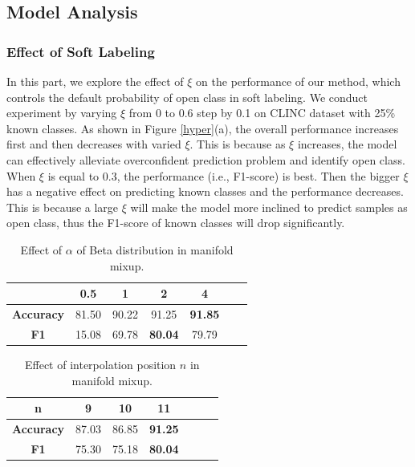 \documentclass[journal]{IEEEtran}
\newcommand{\bm}[1]{\mbox{\boldmath{$#1$}}}
\begin{document}
\subsection{Model Analysis}

\subsubsection{Effect of Soft Labeling}
In this part, we explore the effect of $\xi$ on the performance of our method, which controls the default probability of open class in soft labeling.
We conduct experiment by varying $\xi$ from 0 to 0.6 step by 0.1 on CLINC dataset with 25\% known classes.
As shown in Figure \ref{hyper}(a), the overall performance increases first and then decreases with varied $\xi$.
This is because as $\xi$ increases, the model can effectively alleviate overconfident prediction problem and identify open class.
When $\xi$ is equal to 0.3, the performance (i.e., F1-score) is best.
Then the bigger $\xi$ has a negative effect on predicting known classes and the performance decreases.
This is because a large $\xi$ will make the model more inclined to predict samples as open class, thus the F1-score of known classes will drop significantly.

\begin{table} \setlength{\tabcolsep}{10pt}
\centering
\caption{Effect of $\alpha$ of Beta distribution in manifold mixup.}\label{alpha}
\begin{tabular}{ccccccc}
\toprule
{\bm \alpha}&\textbf{0.5}&\textbf{1}&\textbf{2}&\textbf{4}\\
\midrule
\textbf{Accuracy} &81.50&90.22&91.25&\bf{91.85} \\
\textbf{F1}&15.08&69.78&\bf{80.04}& 79.79\\
\bottomrule
\end{tabular}
\end{table}


\begin{table} \setlength{\tabcolsep}{15pt}
\centering
\caption{Effect of interpolation position $n$ in manifold mixup.} \label{n}
\begin{tabular}{ccccccc}
\toprule
\textbf{n}&\textbf{9}&\textbf{10}&\textbf{11}\\
\midrule
\textbf{Accuracy} &87.03&86.85&\bf{91.25} \\
\textbf{F1}&75.30&75.18&\bf{80.04}\\
\bottomrule
\end{tabular}
\end{table}
\end{document}
